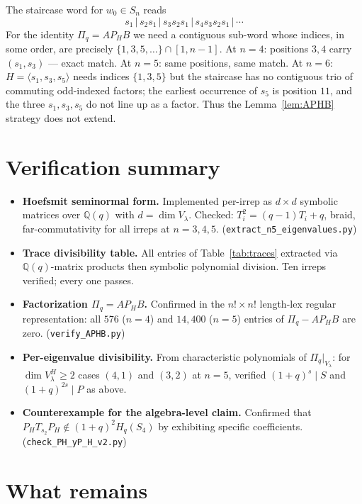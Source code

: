 \documentclass[11pt]{article}
\theoremstyle{definition}
\newcommand{\Pq}{\Pi_q}
\newcommand{\PH}{P_H}
\newcommand{\Q}{\mathbb{Q}}
\begin{document}
The staircase word for $w_0\in S_n$ reads
\[
  s_1\,|\,s_2s_1\,|\,s_3s_2s_1\,|\,s_4s_3s_2s_1\,|\,\cdots
\]
For the identity $\Pq=A\PH B$ we need a contiguous sub-word whose
indices, in some order, are precisely $\{1,3,5,\ldots\}\cap[1,n-1]$.
At $n=4$: positions $3,4$ carry $(s_1,s_3)$ --- exact match. At $n=5$:
same positions, same match. At $n=6$: $H=\langle s_1,s_3,s_5\rangle$
needs indices $\{1,3,5\}$ but the staircase has no contiguous trio of
commuting odd-indexed factors; the earliest occurrence of $s_5$ is
position $11$, and the three $s_1,s_3,s_5$ do not line up as a
factor. Thus the Lemma~\ref{lem:APHB} strategy does not extend.

\section{Verification summary}

\begin{itemize}
\item \textbf{Hoefsmit seminormal form.} Implemented per-irrep as
  $d\times d$ symbolic matrices over $\Q(q)$ with $d=\dim V_\lambda$.
  Checked: $T_i^2=(q-1)T_i+q$, braid, far-commutativity for all irreps at
  $n=3,4,5$. ({\tt extract\_n5\_eigenvalues.py})
\item \textbf{Trace divisibility table.} All entries of
  Table~\ref{tab:traces} extracted via
  $\Q(q)$-matrix products then symbolic polynomial division.
  Ten irreps verified; every one passes.
\item \textbf{Factorization $\Pq=A\PH B$.} Confirmed in the
  $n!\times n!$ length-lex regular representation: all $576$ ($n=4$) and
  $14{,}400$ ($n=5$) entries of $\Pq-A\PH B$ are zero.
  ({\tt verify\_APHB.py})
\item \textbf{Per-eigenvalue divisibility.} From characteristic
  polynomials of $\Pq|_{V_\lambda}$: for $\dim V_\lambda^H\ge 2$ cases
  $(4,1)$ and $(3,2)$ at $n=5$, verified $(1+q)^s\mid S$ and
  $(1+q)^{2s}\mid P$ as above.
\item \textbf{Counterexample for the algebra-level claim.}
  Confirmed that $\PH T_{s_2}\PH\notin(1+q)^2 H_q(S_4)$ by exhibiting
  specific coefficients. ({\tt check\_PH\_yP\_H\_v2.py})
\end{itemize}

\section{What remains}
\end{document}
